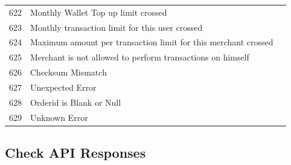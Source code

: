 \documentclass{article}
\newcommand{\xmark}{\ding{55}}
\begin{document}
\begin{longtable}{||c|p{12.5cm}||c||}
622 &Monthly Wallet Top up limit crossed& \textcolor{red} {\xmark}  \\
623 &Monthly transaction limit for this user crossed& \textcolor{red} {\xmark}  \\
624 &Maximum amount per transaction limit for this merchant crossed& \textcolor{red} {\xmark}  \\
625 &Merchant is not allowed to perform transactions on himself& \textcolor{red} {\xmark}  \\
626 &Checksum Mismatch& \textcolor{red} {\xmark}  \\
627 &Unexpected Error& \textcolor{red} {\xmark}  \\
628 &Orderid is Blank or Null& \textcolor{red} {\xmark}  \\
629 &Unknown Error& \textcolor{red} {\xmark}  \\
\end{longtable}
\newpage
\subsection{Check API Responses}
\end{document}
